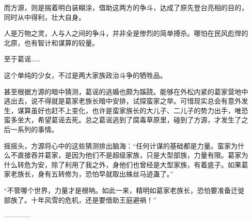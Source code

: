 \begin{this_body}
而方源，则是揣着明白装糊涂，借助这两方的争斗，达成了原先登台亮相的目的，同时从中得利，壮大自身。

人是万物之灵，人与人之间的争斗，并非全是惨烈的简单搏杀。哪怕在民风彪悍的北原，也有智计和谋算的较量。

至于葛谣……

这个单纯的少女，不过是两大家族政治斗争的牺牲品。

甚至根据方源的暗中猜测，葛谣的逃婚也颇为蹊跷。能够在外松内紧的葛家营地中逃出去，说不得就是葛家老族长暗中安排，试探蛮家之举。可惜现实总会有意外发生，谋算虽好也赶不上变化，也许是蛮家族长的大儿子、二儿子的势力出手，唯恐蛮多坐大，希望葛谣去死。总之葛谣逃到了腐毒草原里，碰到了方源，才发生了之后一系列的事情。

摇摇头，方源将心中的这些猜测排出脑海：“任何计谋的基础都是力量。蛮家为什么不直接吞并葛家，是因为他们不是超级家族，只是大型部族，力量有限。葛家为什么转危为安，除了利用了我之外，身他们也曾经是大型家族，有着底子。如果葛家老族长，身有五转修为，恐怕早就取出蛛丝马迹蛊了。”

“不管哪个世界，力量才是根呐。如此一来，精明如葛家老族长，恐怕要准备迁徙部族了。十年风雪的危机，还是要借助王庭避祸！”

------------

\end{this_body}

